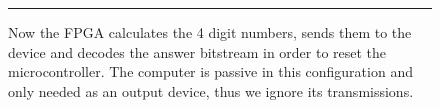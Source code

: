 \begin{figure}[tb]
    \begin{center}
        
        \caption{Now the FPGA calculates the 4 digit numbers, sends them to the device and decodes the answer bitstream in order to reset the microcontroller. The computer is passive in this configuration and only needed as an output device, thus we ignore its transmissions.}
        \label{fig:as4-schematic-2}
        \vspace{1em}\hrule
    \end{center}
\end{figure}








